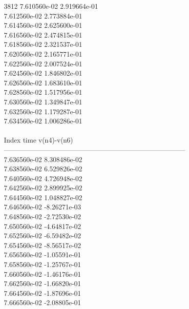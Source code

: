 3812	7.610560e-02	2.919664e-01	\\ 	7.612560e-02	2.773884e-01	\\ 	7.614560e-02	2.625600e-01	\\ 	7.616560e-02	2.474815e-01	\\ 	7.618560e-02	2.321537e-01	\\ 	7.620560e-02	2.165771e-01	\\ 	7.622560e-02	2.007524e-01	\\ 	7.624560e-02	1.846802e-01	\\ 	7.626560e-02	1.683610e-01	\\ 	7.628560e-02	1.517956e-01	\\ 	7.630560e-02	1.349847e-01	\\ 	7.632560e-02	1.179287e-01	\\ 	7.634560e-02	1.006286e-01	\\ \hline
\\ \hline
Index   time            v(n4)-v(n6)     \\ \hline
--------------------------------------------------------------------------------\\ 	7.636560e-02	8.308486e-02	\\ 	7.638560e-02	6.529826e-02	\\ 	7.640560e-02	4.726948e-02	\\ 	7.642560e-02	2.899925e-02	\\ 	7.644560e-02	1.048827e-02	\\ 	7.646560e-02	-8.26271e-03	\\ 	7.648560e-02	-2.72530e-02	\\ 	7.650560e-02	-4.64817e-02	\\ 	7.652560e-02	-6.59482e-02	\\ 	7.654560e-02	-8.56517e-02	\\ 	7.656560e-02	-1.05591e-01	\\ 	7.658560e-02	-1.25767e-01	\\ 	7.660560e-02	-1.46176e-01	\\ 	7.662560e-02	-1.66820e-01	\\ 	7.664560e-02	-1.87696e-01	\\ 	7.666560e-02	-2.08805e-01	\\ \hline
